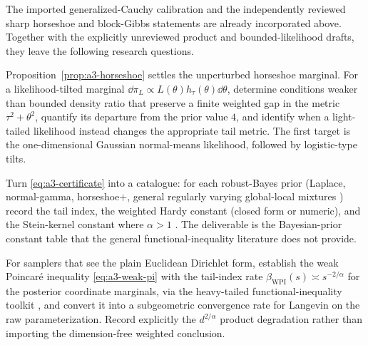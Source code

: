 \documentclass[../../main.tex]{subfiles}
\begin{document}
The imported generalized-Cauchy calibration and the independently reviewed sharp horseshoe and
block-Gibbs statements are already incorporated above. Together with the explicitly unreviewed
product and bounded-likelihood drafts, they leave the following research questions.

\begin{question}
\label{q:a3-horseshoe}
Proposition~\ref{prop:a3-horseshoe} settles the unperturbed horseshoe marginal.  For a
likelihood-tilted marginal $\dd\pi_L\propto L(\theta)h_\tau(\theta)\dd\theta$, determine
conditions weaker than bounded density ratio that preserve a finite weighted gap in the metric
$\tau^2+\theta^2$, quantify its departure from the prior value $4$, and identify when a
light-tailed likelihood instead changes the appropriate tail metric.  The first target is the
one-dimensional Gaussian normal-means likelihood, followed by logistic-type tilts.
\end{question}

\begin{question}
\label{q:a3-catalogue}
Turn \eqref{eq:a3-certificate} into a catalogue: for each robust-Bayes prior (Laplace, normal-gamma,
horseshoe$+$, general regularly varying global-local mixtures \cite{BhadraDattaPolsonWillard2016})
record the tail index, the weighted Hardy constant (closed form or numeric), and the Stein-kernel
constant where $\alpha>1$ \cite{Saumard2019SteinKernel}. The deliverable is the Bayesian-prior
constant table that the general functional-inequality literature does not provide.
\end{question}

\begin{question}
\label{q:a3-weak}
For samplers that see the plain Euclidean Dirichlet form, establish the weak Poincar\'e inequality
\eqref{eq:a3-weak-pi} with the tail-index rate $\beta_{\mathrm{WPI}}(s)\asymp s^{-2/\alpha}$ for the
posterior coordinate marginals, via the heavy-tailed functional-inequality toolkit
\cite{CattiauxGozlanGuillinRoberto2010,CattiauxGuillin2010}, and convert it into a subgeometric
convergence rate for Langevin on the raw parameterization. Record explicitly the
$d^{2/\alpha}$ product degradation rather than importing the dimension-free weighted conclusion.
\end{question}
\end{document}
